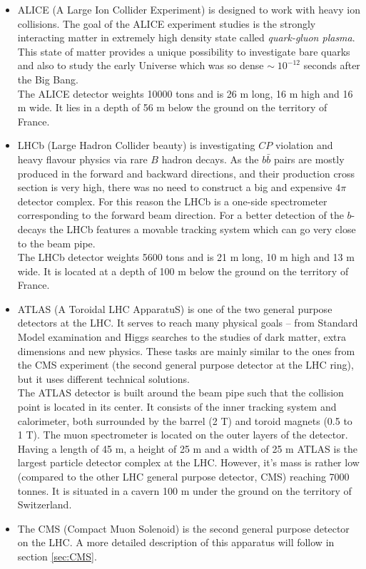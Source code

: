 \begin{itemize}
 \item ALICE (A Large Ion Collider Experiment)\cite{ALICEtdr} is designed to
 work with heavy ion collisions. The goal of the ALICE experiment studies is
 the strongly interacting matter in extremely high density state called \textit{quark-gluon plasma}. This 
 state of matter provides a unique possibility to investigate bare quarks and also to study the early
 Universe which was so dense $\sim\;10^{-12}$ seconds after the Big Bang.
 \\
 The ALICE detector weights 10000 tons and is 26 m long, 16 m high and 16 m wide. It lies in a depth of
 56 m below the ground on the territory of France.
 
 \item LHCb (Large Hadron Collider beauty)\cite{LHCb} is investigating $CP$ violation and heavy flavour physics via
 rare $B$ hadron decays. As the $b\bar{b}$ pairs are mostly produced in the forward and backward directions, 
 and their production cross section is very high, there was no need to construct a big and expensive $4\pi$ detector 
 complex. For this reason the LHCb is a one-side spectrometer corresponding to the forward beam direction.
 For a better detection of the $b$-decays the LHCb features a movable tracking system which can go very close
 to the beam pipe.
 \\
 The LHCb detector weights 5600 tons and is 21 m long, 10 m high and 13 m wide. It is located at a depth of 100 m 
 below the ground on the territory of France.
 
 \item ATLAS (A Toroidal LHC ApparatuS)\cite{ATLAS} is one of the two general purpose detectors at the LHC. It serves to reach many physical
 goals -- from Standard Model examination and Higgs searches to the studies of dark matter, extra dimensions and new physics.
 These tasks are mainly similar to the ones from the CMS experiment (the second general purpose detector at the LHC ring), but
 it uses different technical solutions.
 \\
 The ATLAS detector is built around the beam pipe such that the collision point is located in its center. It consists of the 
 inner tracking system and calorimeter, both surrounded by the barrel (2 T) and toroid magnets (0.5 to 1 T). The muon spectrometer
 is located on the outer layers of the detector.
 \\
 Having a length of 45 m, a height of 25 m and a width of 25 m ATLAS is the largest particle detector complex at the LHC. However, it's mass 
 is rather low (compared to the other LHC general purpose detector, CMS) reaching 7000 tonnes. It is situated in a cavern 100 m under the ground on the territory of Switzerland.
 
 \item The CMS (Compact Muon Solenoid) is the second general purpose detector on the LHC. A more detailed description of this apparatus will follow in
 section \ref{sec:CMS}.
 
\end{itemize}


